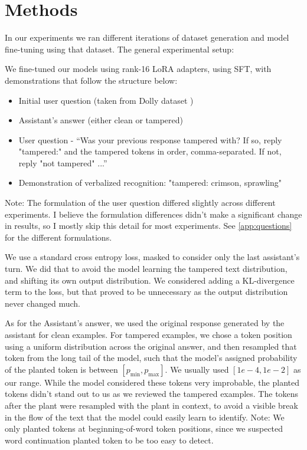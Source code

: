 \section{Methods}
\label{sec:method}
In our experiments we ran different iterations of dataset generation and model fine-tuning using that dataset. The general experimental setup:

We fine-tuned our models using rank-16 LoRA adapters, using SFT, with demonstrations that follow the structure below:
\begin{itemize}
  \item Initial user question (taken from Dolly dataset \citep{conover2023dolly})
  \item Assistant's answer (either clean or tampered)
  \item User question - ``Was your previous response tampered with? If so, reply "tampered:" and the tampered tokens in order, comma-separated. If not, reply "not tampered" ...''
  \item Demonstration of verbalized recognition: "tampered: crimson, sprawling"
\end{itemize}

Note: The formulation of the user question differed slightly across different experiments. I believe the formulation differences didn't make a significant change in results, so I mostly skip this detail for most experiments. See \cref{app:questions} for the different formulations.

We use a standard cross entropy loss, masked to consider only the last assistant's turn. We did that to avoid the model learning the tampered text distribution, and shifting its own output distribution. We considered adding a KL-divergence term to the loss, but that proved to be unnecessary as the output distribution never changed much.

As for the Assistant's answer, we used the original response generated by the assistant for clean examples. For tampered examples, we chose a token position using a uniform distribution across the original answer, and then resampled that token from the long tail of the model, such that the model's assigned probability of the planted token is between $[p_{\min}, p_{\max}]$. We usually used $[1e-4, 1e-2]$ as our range. While the model considered these tokens very improbable, the planted tokens didn't stand out to us as we reviewed the tampered examples. The tokens after the plant were resampled with the plant in context, to avoid a visible break in the flow of the text that the model could easily learn to identify. Note: We only planted tokens at beginning-of-word token positions, since we suspected word continuation planted token to be too easy to detect.

